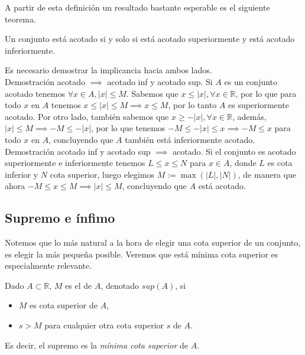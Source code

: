 \documentclass[12pt]{book}
\begin{document}
A partir de esta definición un resultado bastante esperable es el siguiente teorema.

\begin{theoremenv}
    Un conjunto está acotado si y solo si está acotado superiormente y está acotado inferiormente.
\end{theoremenv}
\begin{proofenv}
    Es necesario demostrar la implicancia hacia ambos lados.\\
    
    Demostración acotado $\implies$ acotado inf y acotado sup. Si $A$ es un conjunto acotado tenemos $\forall x\in A, |x|\leq M$. Sabemos que $x\leq|x|,\forall x\in\mathbb{R}$, por lo que para todo $x$ en $A$ tenemos $x\leq|x|\leq M\implies x\leq M$, por lo tanto $A$ es superiormente acotado. Por otro lado, también sabemos que $x\ge - |x|,\forall x\in\mathbb{R}$, además, $|x|\leq M\implies -M\leq -|x|$, por lo que tenemos $-M\leq -|x|\leq x\implies -M\leq x$ para todo $x$ en $A$, concluyendo que $A$ también está inferiormente acotado.\\

    Demostración acotado inf y acotado sup $\implies$ acotado. Si el conjunto es acotado superiormente e inferiormente tenemos $L\leq x\leq N$ para $x\in A$, donde $L$ es cota inferior y $N$ cota superior, luego elegimos $M:=\max(|L|,|N|)$, de manera que ahora $-M\leq x\leq M\implies |x|\leq M$, concluyendo que $A$ está acotado.
\end{proofenv}

\subsection{Supremo e ínfimo}

Notemos que lo más natural a la hora de elegir una cota superior de un conjunto, es elegir la más pequeña posible. Veremos que está mínima cota superior es especialmente relevante.
\noindent
\begin{definitionenv}
    Dado $A\subset \mathbb{R}$, $M$ es el  de $A$, denotado $sup(A)$, si
    \begin{itemize}
        \item $M$ es cota superior de $A$,
        \item $s >M$ para cualquier otra cota superior $s$ de $A$.
    \end{itemize}
    Es decir, el supremo es la \textit{mínima cota superior} de $A$.
\end{definitionenv}
\end{document}
